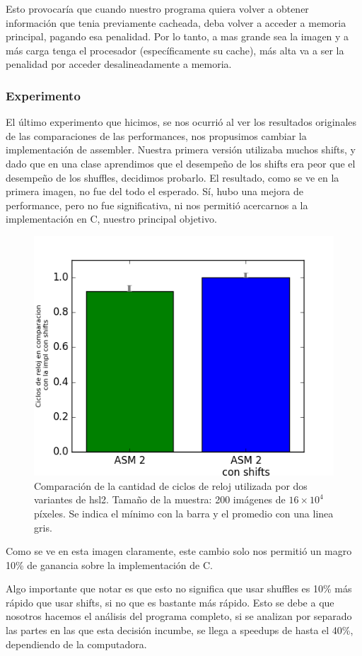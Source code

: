 Esto provocaría que cuando nuestro programa quiera volver a obtener información que tenia previamente cacheada, deba volver a acceder a memoria principal, pagando esa penalidad. Por lo tanto, a mas grande sea la imagen y a más carga tenga el procesador (específicamente su cache), más alta va a ser la penalidad por acceder desalineadamente a memoria.



\subsubsection*{Experimento}
El último experimento que hicimos, se nos ocurrió al ver los resultados originales de las comparaciones de las performances, nos propusimos cambiar la implementación de assembler. Nuestra primera versión utilizaba muchos shifts, y dado que en una clase aprendimos que el desempeño de los shifts era peor que el desempeño de los shuffles, decidimos probarlo. El resultado, como se ve en la primera imagen, no fue del todo el esperado. Sí, hubo una mejora de performance, pero no fue significativa, ni nos permitió acercarnos a la implementación en C, nuestro principal objetivo.


\begin{figure}[H] 
	\centering
  \includegraphics[scale=0.7]{images/hsl-shsh.png}
  \caption{Comparación de la cantidad de ciclos de reloj utilizada por dos variantes de hsl2. Tamaño de la muestra: 200 imágenes de $16 \times 10^4$ píxeles. Se indica el mínimo con la barra y el promedio con una linea gris.}
\end{figure}

Como se ve en esta imagen claramente, este cambio solo nos permitió un magro 10\% de ganancia sobre la implementación de C.

Algo importante que notar es que esto no significa que usar shuffles es 10\% más rápido que usar shifts, si no que es bastante más rápido. Esto se debe a que nosotros hacemos el análisis del programa completo, si se analizan por separado las partes en las que esta decisión incumbe, se llega a speedups de hasta el 40\%, dependiendo de la computadora.
\\



